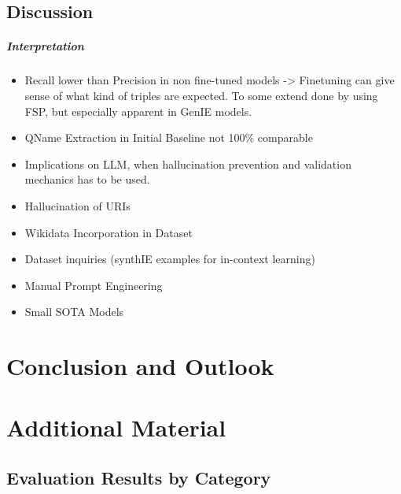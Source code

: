 \documentclass[a4paper,oneside,bibliography=totoc]{scrbook}
\begin{document}
\section{Discussion}
\label{sec:discussion}

\paragraph{Interpretation}
\begin{itemize}
  \item Recall lower than Precision in non fine-tuned models -> Finetuning can give sense of what kind of triples are expected. To some extend done by using FSP, but especially apparent in GenIE models.
  \item QName Extraction in Initial Baseline not 100\% comparable
  \item Implications on LLM, when hallucination prevention and validation mechanics has to be used.
\end{itemize}

\begin{itemize}
  \item Hallucination of URIs
  \item Wikidata Incorporation in Dataset
  \item Dataset inquiries (synthIE examples for in-context learning)
  \item Manual Prompt Engineering
  \item Small SOTA Models
\end{itemize}

\chapter{Conclusion and Outlook}
\label{ch:conclusion_outlook}




\appendix
\chapter{Additional Material}
\label{ch:additional_material}

\section{Evaluation Results by Category}
\end{document}
